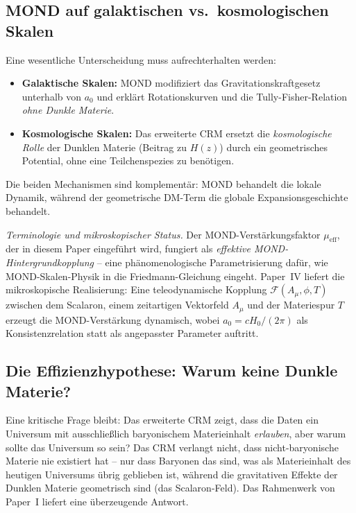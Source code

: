 \documentclass[aps,prd,twocolumn,superscriptaddress,nofootinbib]{revtex4-2}
\begin{document}
\subsection{MOND auf galaktischen vs.\ kosmologischen Skalen}

Eine wesentliche Unterscheidung muss aufrechterhalten werden:
\begin{itemize}
\item \textbf{Galaktische Skalen:} MOND modifiziert das Gravitationskraftgesetz unterhalb von $a_0$ und erkl\"art Rotationskurven und die Tully-Fisher-Relation \textit{ohne Dunkle Materie}.
\item \textbf{Kosmologische Skalen:} Das erweiterte CRM ersetzt die \textit{kosmologische Rolle} der Dunklen Materie (Beitrag zu $H(z)$) durch ein geometrisches Potential, ohne eine Teilchenspezies zu ben\"otigen.
\end{itemize}

Die beiden Mechanismen sind komplement\"ar: MOND behandelt die lokale Dynamik, w\"ahrend der geometrische DM-Term die globale Expansionsgeschichte behandelt.

\textit{Terminologie und mikroskopischer Status.} Der MOND-Verst\"arkungsfaktor $\mu_{\mathrm{eff}}$, der in diesem Paper eingef\"uhrt wird, fungiert als \emph{effektive MOND-Hintergrundkopplung} -- eine ph\"anomenologische Parametrisierung daf\"ur, wie MOND-Skalen-Physik in die Friedmann-Gleichung eingeht. Paper~IV \cite{Geiger2026d} liefert die mikroskopische Realisierung: Eine teleodynamische Kopplung $\mathcal{F}(A_\mu, \phi, T)$ zwischen dem Scalaron, einem zeitartigen Vektorfeld $A_\mu$ und der Materiespur $T$ erzeugt die MOND-Verst\"arkung dynamisch, wobei $a_0 = cH_0/(2\pi)$ als Konsistenzrelation statt als angepasster Parameter auftritt.

\subsection{Die Effizienzhypothese: Warum keine Dunkle Materie?}
\label{subsec:efficiency}

Eine kritische Frage bleibt: Das erweiterte CRM zeigt, dass die Daten ein Universum mit ausschlie\ss{}lich baryonischem Materieinhalt \textit{erlauben}, aber warum sollte das Universum so sein? Das CRM verlangt nicht, dass nicht-baryonische Materie nie existiert hat -- nur dass Baryonen das sind, was als Materieinhalt des heutigen Universums \"ubrig geblieben ist, w\"ahrend die gravitativen Effekte der Dunklen Materie geometrisch sind (das Scalaron-Feld). Das Rahmenwerk von Paper~I liefert eine \"uberzeugende Antwort.
\end{document}
